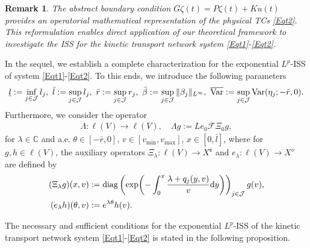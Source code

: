 \documentclass[onecolumn]{autart}
\def\la{\lambda}
\def\calF{{\mathcal{F}}}
\def\C{\mathbb C}
\newtheorem{remark}{Remark}[section]
\numberwithin{equation}{section}
\begin{document}
	\begin{remark}
     The abstract boundary condition $G \zeta(t) = P \zeta(t)+K u(t)$ provides an operatorial mathematical representation of the physical TCs \eqref{Eqt2}. This reformulation enables direct application of our theoretical framework to investigate the ISS for the kinetic transport network system \eqref{Eqt1}-\eqref{Eqt2}.
	\end{remark}
	
	In the sequel, we establish a complete characterization for the exponential $L^p$-ISS of system \eqref{Eqt1}-\eqref{Eqt2}. To this ends, we introduce the following parameters
	\begin{equation*}
		\underline{l}:= \inf_{j\in \mathcal{J}}l_j,\  \bar{l}:=\sup_{j\in \mathcal{J}}l_j,\
		\bar{r}:=\sup_{j\in \mathcal{J}}r_j, \
		\bar{\beta}:= \sup_{j\in \mathcal{J}}\Vert\beta_j\Vert_{L^{\infty}} ,\  \overline{{\rm Var}}:=\sup_{j\in \mathcal{J}}{\rm Var}(\eta_j;-\bar{r},0).
	\end{equation*}
	Furthermore, we consider the operator
	\begin{align}\label{Matrix-H}
		\Lambda:{\bm \ell}(V)\to {\bm \ell}(V), \quad
		\Lambda g :={L} e_0 \calF\Xi_0 g,
	\end{align}
	for $\lambda \in \C$ and a.e. $\theta \in [-\bar{r},0]$, $v \in [v_{\min},v_{\max}]$, $x \in [0,\bar{l}]$, where for  $ g,h\in {\bm \ell}(V)$, the auxiliary operators $\Xi_\la:{\bm \ell}(V)\to X^{\mathsf{e}}$ and $e_\la:{\bm \ell}(V)\to X^{o}$ are defined by
	\begin{subequations}\label{Dirichlet-operators}
		\begin{align}
			(\Xi_\la g)(x,v)&:=\operatorname{diag}\left({{\exp}}{\left(-\int_0^x \frac{\lambda + q_j(y,v)}{v} {\rm d}y  \right)}\right)_{j\in \mathcal{J}}g(v),\\
			(e_\la h )(\theta,v)&:= e^{\la\theta} h(v).
		\end{align}
	\end{subequations}
	
	
	The necessary and sufficient conditions for the exponential $L^p$-ISS of the kinetic transport network system \eqref{Eqt1}-\eqref{Eqt2} is stated in the following proposition.
	
\end{document}
